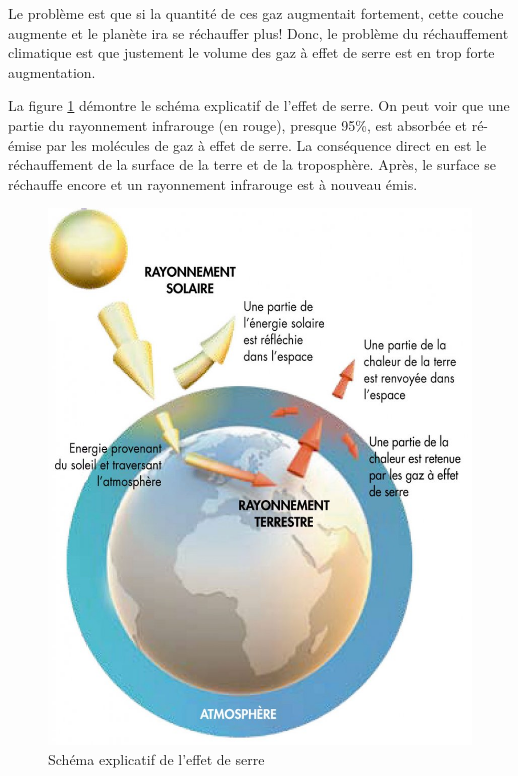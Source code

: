 \documentclass[a4paper,11pt]{article}
\begin{document}
Le problème est que si la quantité de ces gaz augmentait fortement, cette couche
augmente et le planète ira se réchauffer plus! 
Donc, le  problème du réchauffement climatique  est que justement  le volume des
gaz à effet de serre est en trop forte augmentation.

La figure \ref{fig:effetserre} démontre le schéma explicatif de l'effet de serre.
On peut voir que une partie du rayonnement infrarouge (en rouge), presque 95\%, est absorbée et ré-émise par les molécules
de gaz  à effet de serre.  La conséquence direct  en est le réchauffement  de la
surface de la terre et de la troposphère. Après, le surface se réchauffe encore et un
rayonnement infrarouge est à nouveau émis. 

\begin{figure}[H]
  \begin{centering}
    \includegraphics[scale=0.3]{fig/effet-de-serre}
    \par\end{centering}
  \caption{Schéma explicatif de l'effet de serre}
  \label{fig:effetserre}
\end{figure}
\end{document}
